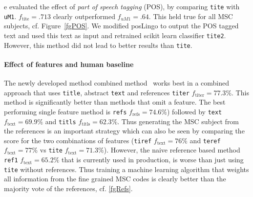 e evaluated the effect of \emph{part of speech tagging} (POS), by comparing \texttt{tite} with \texttt{uM1}. \(f_{\text{tite}} = .713\) clearly outperformed \(f_{uM1} = .64.\)
This held true for all MSC subjects, cf. Figure~\ref{fgPOS}.
We modified posLingo to output the POS tagged text and used this text as input and retrained scikit learn classifier \texttt{tite2}.
However, this method did not lead to better results than \texttt{tite}.

\paragraph{Effect of features and human baseline}
The newly developed method combined method~\cite{Scharpf2020} works best in a combined approach that uses \texttt{title}, abstract \texttt{text} and references \texttt{titer} $f_\mathrm{titer}=77.3\%.$
This method is significantly better than methods that omit a feature.
The best performing single feature method is \texttt{refs} $f_\mathrm{refs}=74.6\%$) followed by \texttt{text} $f_\mathrm{text}=69.9\%$ and \texttt{titls} $f_\mathrm{titls}=62.3\%$.
Thus generating the MSC subject from the references is an important strategy which can also be seen by comparing the score for the two combinations of features (\texttt{tiref} $f_\mathrm{text}=76\%$ and \texttt{teref} $f_\mathrm{text}=77\%$ vs \texttt{tite} $f_\mathrm{text}=71.3\%$).
However, the naive reference based method \texttt{ref1} $f_\mathrm{text}=65.2\%$ that is currently used in production, is worse than just using \texttt{tite} without references.
Thus training a machine learning algorithm that weights all information from the fine grained MSC codes is clearly better than the majority vote of the references, cf. \ref{fgRefs}.




